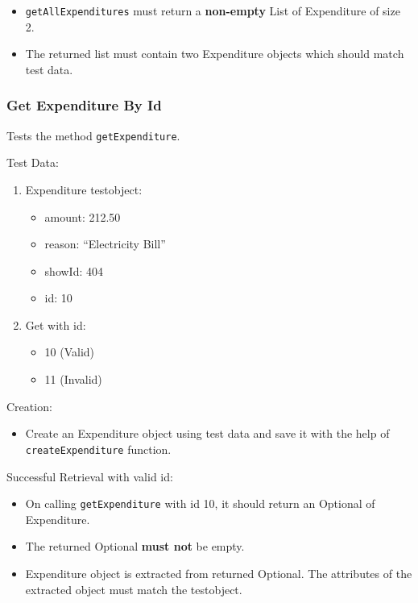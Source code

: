 \documentclass[]{article}
\providecommand{\tightlist}{%
  \setlength{\itemsep}{0pt}\setlength{\parskip}{0pt}}
\begin{document}
\begin{itemize}
\tightlist
\item
  \texttt{getAllExpenditures} must return a \textbf{non-empty} List of
  Expenditure of size 2.
\item
  The returned list must contain two Expenditure objects which should
  match test data.
\end{itemize}

\hypertarget{get-expenditure-by-id}{%
\subsubsection{Get Expenditure By Id}\label{get-expenditure-by-id}}

Tests the method \texttt{getExpenditure}.

Test Data:

\begin{enumerate}
\def\labelenumi{\arabic{enumi}.}
\tightlist
\item
  Expenditure testobject:

  \begin{itemize}
  \tightlist
  \item
    amount: 212.50
  \item
    reason: ``Electricity Bill''
  \item
    showId: 404
  \item
    id: 10
  \end{itemize}
\item
  Get with id:

  \begin{itemize}
  \tightlist
  \item
    10 (Valid)
  \item
    11 (Invalid)
  \end{itemize}
\end{enumerate}

Creation:

\begin{itemize}
\tightlist
\item
  Create an Expenditure object using test data and save it with the help
  of \texttt{createExpenditure} function.
\end{itemize}

Successful Retrieval with valid id:

\begin{itemize}
\tightlist
\item
  On calling \texttt{getExpenditure} with id 10, it should return an
  Optional of Expenditure.
\item
  The returned Optional \textbf{must not} be empty.
\item
  Expenditure object is extracted from returned Optional. The attributes
  of the extracted object must match the testobject.
\end{itemize}
\end{document}
